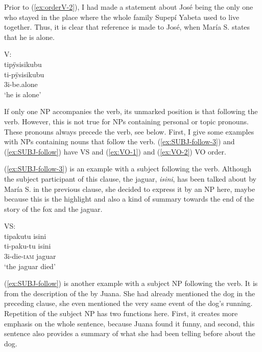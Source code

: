Prior to (\ref{ex:orderV-2}), I had made a statement about José being the only one who stayed in the place where the whole family Supepí Yabeta used to live together. Thus, it is clear that reference is made to José, when María S. states that he is alone.

\ea\label{ex:orderV-2}
\begingl
\glpreamble \textup{V:}\\ tipÿsisikubu\\
\gla ti-pÿsisikubu\\
\glb 3i-be.alone\\
\glft ‘he is alone’
\endgl
\trailingcitation{[rxx-e120511l.187]}
\xe

If only one NP accompanies the verb, its unmarked position is that following the verb. However, this is not true for NPs containing personal or topic pronouns. These pronouns always precede the verb, see below. First, I give some examples with NPs containing nouns that follow the verb. (\ref{ex:SUBJ-follow-3}) and (\ref{ex:SUBJ-follow}) have VS and (\ref{ex:VO-1}) and (\ref{ex:VO-2}) VO order.

(\ref{ex:SUBJ-follow-3}) is an example with a subject following the verb. Although the subject participant of this clause, the jaguar, \textit{isini}, has been talked about by María S. in the previous clause, she decided to express it by an NP here, maybe because this is the highlight and also a kind of summary towards the end of the story of the fox and the jaguar.

\ea\label{ex:SUBJ-follow-3}
\begingl 
\glpreamble \textup{VS:}\\tipakutu isini\\
\gla ti-paku-tu isini\\ 
\glb 3i-die-\textsc{iam} jaguar\\
\glft ‘the jaguar died’
\trailingcitation{[rxx-n120511l-1.040]}
\xe

(\ref{ex:SUBJ-follow}) is another example with a subject NP following the verb. It is from the description of the  by Juana. She had already mentioned the dog in the preceding clause, she even mentioned the very same event of the dog’s running. Repetition of the subject NP has two functions here. First, it creates more emphasis on the whole sentence, because Juana found it funny, and second, this sentence also provides a summary of what she had been telling before about the dog.

